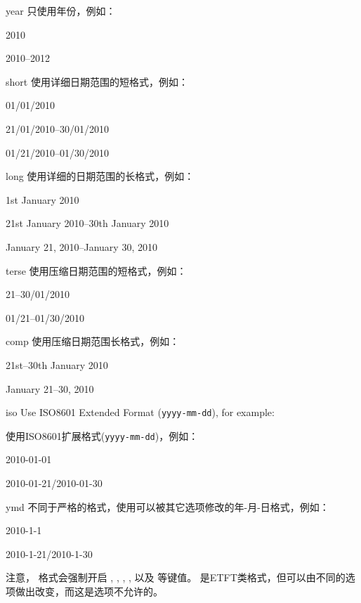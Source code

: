 \begin{optionlist}
\begin{valuelist}
\item[year] %
只使用年份，例如：\par
2010\par
2010--2012\par
\item[short] %
使用详细日期范围的短格式，例如：\par
01/01/2010\par
21/01/2010--30/01/2010\par
01/21/2010--01/30/2010
\item[long] %
使用详细的日期范围的长格式，例如：\par
1st January 2010\par
21st January 2010--30th January 2010\par
January 21, 2010--January 30, 2010\par
\item[terse] %
使用压缩日期范围的短格式，例如：\par
21--30/01/2010\par
01/21--01/30/2010
\item[comp] %
使用压缩日期范围长格式，例如：\par
21st--30th January 2010\par
January 21--30, 2010\par
\item[iso] Use ISO8601 Extended Format (\texttt{yyyy-mm-dd}), for example:\par
使用ISO8601扩展格式(\texttt{yyyy-mm-dd})，例如：\par
2010-01-01\par
2010-01-21/2010-01-30
\item[ymd] %
不同于严格的格式，使用可以被其它选项修改的年-月-日格式，例如：\par
2010-1-1\par
2010-1-21/2010-1-30
\end{valuelist}
%
注意， 格式会强制开启 , , , ,  以及  等键值。 是ETFT类格式，但可以由不同的选项做出改变，而这是选项不允许的。


\end{optionlist}
